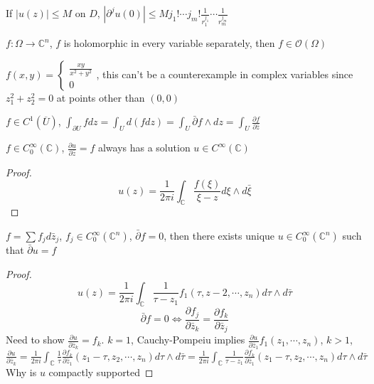 \documentclass[../main.tex]{subfiles}
\begin{document}
\begin{theorem}
If $|u(z)|\leq M$ on $D$, $|\partial^ju(0)|\leq Mj_1!\cdots j_m!\frac{1}{r_1^{j_1}}\cdots\frac{1}{r_m^{j_m}}$
\end{theorem}

\begin{theorem}
$f:\Omega\to\mathbb C^n$, $f$ is holomorphic in every variable separately, then $f\in\mathcal O(\Omega)$
\end{theorem}

\begin{example}
$f(x,y)=\begin{cases}
\frac{xy}{x^2+y^2} \\
0
\end{cases}$, this can't be a counterexample in complex variables since $z_1^2+z_2^2=0$ at points other than $(0,0)$
\end{example}

\begin{theorem}
$f\in C^1(\overline U)$, $\int_{\partial U}fdz=\int_{U}d(fdz)=\int_U\bar\partial f\wedge dz=\int_U\frac{\partial f}{\partial\bar z}$
\end{theorem}

\begin{theorem}
$f\in C^\infty_0(\mathbb C)$, $\frac{\partial u}{\partial\bar z}=f$ always has a solution $u\in C^\infty(\mathbb C)$
\end{theorem}

\begin{proof}
\[u(z)=\frac{1}{2\pi i}\int_{\mathbb C}\frac{f(\xi)}{\xi-z}d\xi\wedge d\bar\xi\]
\end{proof}

\begin{theorem}
$f=\sum f_jd\bar z_j$, $f_j\in C^\infty_0(\mathbb C^n)$, $\bar\partial f=0$, then there exists unique $u\in C^\infty_0(\mathbb C^n)$ such that $\bar\partial u=f$
\end{theorem}

\begin{proof}
\[u(z)=\frac{1}{2\pi i}\int_{\mathbb C}\frac{1}{\tau-z_1}f_1(\tau,z-2,\cdots,z_n)d\tau\wedge d\bar\tau\]
\[\bar\partial f=0\Leftrightarrow \frac{\partial f_j}{\partial\bar z_k}=\frac{\partial f_k}{\partial\bar z_j}\]
Need to show $\frac{\partial u}{\partial\bar z_k}=f_k$. $k=1$, Cauchy-Pompeiu implies $\frac{\partial u}{\partial \bar z_1}f_1(z_1,\cdots,z_n)$, $k>1$, $\frac{\partial u}{\partial\bar z_k}=\frac{1}{2\pi i}\int_{\mathbb C}\frac{1}{\tau}\frac{\partial f_k}{\partial\bar z_1}(z_1-\tau,z_2,\cdots,z_n)d\tau\wedge d\bar\tau=\frac{1}{2\pi i}\int_{\mathbb C}\frac{1}{\tau-z_1}\frac{\partial f_k}{\partial\bar z_1}(z_1-\tau,z_2,\cdots,z_n)d\tau\wedge d\bar\tau$
Why is $u$ compactly supported
\end{proof}
\end{document}
